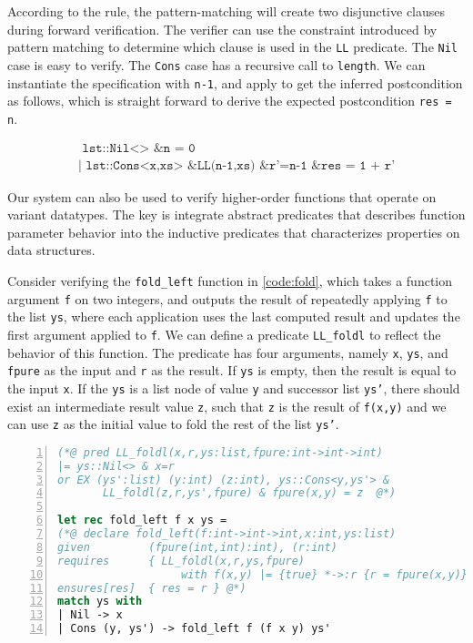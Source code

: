 According to the  rule, the pattern-matching will create two disjunctive clauses during forward verification. The verifier can use the constraint introduced by pattern matching to determine which clause is used in the \texttt{LL} predicate. The \texttt{Nil} case is easy to verify. The \texttt{Cons} case has a recursive call to \texttt{length}. We can instantiate the specification with \texttt{n-1}, and apply  to get the inferred postcondition as follows, which is straight forward to derive the expected postcondition \texttt{res = n}.

$$
\begin{array}{l}
\texttt{ lst::Nil<> \& n = 0 } \\
\texttt{| lst::Cons<x,xs> \& LL(n-1,xs) \& r'=n-1 \& res = 1 + r'}
\end{array}
$$

Our system can also be used to verify higher-order functions that operate on variant datatypes. The key is integrate abstract predicates that describes function parameter behavior into the inductive predicates that characterizes properties on data structures.

Consider verifying the \texttt{fold\_left} function in \autoref{code:fold}, which takes a function argument \texttt{f} on two integers, and outputs the result of repeatedly applying \texttt{f} to the list \texttt{ys}, where each application uses the last computed result and updates the first argument applied to \texttt{f}.
We can define a predicate \texttt{LL\_foldl} to reflect the behavior of this function. The predicate has four arguments, namely \texttt{x}, \texttt{ys}, and \texttt{fpure} as the input and \texttt{r} as the result. If \texttt{ys} is empty, then the result is equal to the input \texttt{x}. If the \texttt{ys} is a list node of value \texttt{y} and successor list \texttt{ys'}, there should exist an intermediate result value \texttt{z}, such that \texttt{z} is the result of \texttt{f(x,y)} and we can use \texttt{z} as the initial value to fold the rest of the list \texttt{ys'}.

\begin{lstlisting}[language=Caml, mathescape=true, xleftmargin=2em, aboveskip=1em, xrightmargin=1em, numbers=left, frame = {TB}, caption=Use inductive predicates to specify functions on variant types, label=code:fold]
(*@ pred LL_foldl(x,r,ys:list,fpure:int->int->int)
|= ys::Nil<> & x=r
or EX (ys':list) (y:int) (z:int), ys::Cons<y,ys'> & 
       LL_foldl(z,r,ys',fpure) & fpure(x,y) = z  @*)

let rec fold_left f x ys = 
(*@ declare fold_left(f:int->int->int,x:int,ys:list)
given         (fpure(int,int):int), (r:int)
requires      { LL_foldl(x,r,ys,fpure) 
                   with f(x,y) |= {true} *->:r {r = fpure(x,y)} }
ensures[res]  { res = r } @*)
match ys with
| Nil -> x
| Cons (y, ys') -> fold_left f (f x y) ys'
\end{lstlisting}

